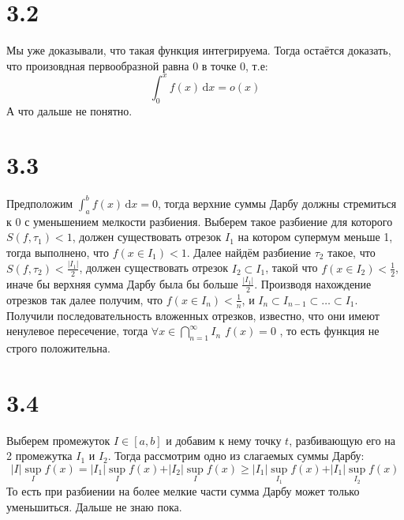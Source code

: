 \documentclass[12pt]{article}
\begin{document}
\section{3.2}
Мы уже доказывали, что такая функция интегрируема. Тогда остаётся доказать, что произовдная 
первообразной равна 0 в точке 0, т.е: 
\[
    \int_{0}^{x} f(x) \,\mathrm{d}x = o(x)
\]
А что дальше не понятно.
\section{3.3}
Предположим $\int_{a}^{b} f(x) \,\mathrm{d}x = 0$, тогда верхние суммы Дарбу должны стремиться к 0 с уменьшением 
мелкости разбиения. Выберем такое разбиение для которого 
$S(f, \tau_1) < 1$, должен существовать отрезок $I_1$ на котором супермум меньше 1, тогда выполнено, что $f(x \in I_1) < 1$. 
Далее найдём разбиение $\tau_2$  такое, что $S(f, \tau_2) < \frac{\left\vert I_1 \right\vert}{2}$, должен существовать 
отрезок $I_2 \subset I_1$, такой что $f(x \in I_2) < \frac{1}{2}$, иначе бы верхняя сумма Дарбу была бы больше $\frac{\left\vert I_1 \right\vert }{2}$. 
Производя нахождение отрезков так далее получим, что $f(x \in I_n) < \frac{1}{n}$, и $I_n \subset I_{n-1} \subset \dots \subset I_1$. 
Получили последовательность вложенных отрезков, известно, что они имеют ненулевое пересечение, тогда $\forall x \in \bigcap_{n=1}^{\infty} I_n$ $f(x) = 0$ , то есть
функция не строго положительна.          

\section{3.4}
Выберем промежуток $I \in [a, b]$ и добавим к нему точку $t$, разбивающую его на 2 промежутка $I_1$ и $I_2$. 
Тогда рассмотрим одно из слагаемых суммы Дарбу: 
\[
    \vert I \vert \sup_I f(x) = \vert I_1 \vert \sup_I f(x) + \vert I_2 \vert \sup_I f(x) \geq \vert I_1 \vert \sup_{I_1} f(x) + \vert I_1 \vert \sup_{I_2} f(x)
\]  
То есть при разбиении на более мелкие части сумма Дарбу может только уменьшиться.
Дальше не знаю пока.
\end{document}
